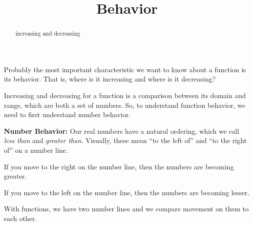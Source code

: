 \documentclass{ximera}
\title{Behavior}
\begin{document}
\begin{abstract}
increasing and decreasing
\end{abstract}
\maketitle



Probably the most important characteristic we want to know about a function is its behavior.  That is, where is it increasing and where is it decreasing? 




Increasing and decreasing for a function is a comparison between its domain and range, which are both a set of numbers.  So, to understand function behavior, we need to first understand number behavior.



\textbf{\textcolor{blue!55!black}{Number Behavior:}}  Our real numbers have a natural ordering, which we call \textit{less than} and \textit{greater than}.  Visually, these mean ``to the left of'' and ``to the right of'' on a number line. 

If you move to the right on the number line, then the numbers are becoming greater. 

If you move to the left on the number line, then the numbers are becoming lesser. 











With functions, we have two number lines and we compare movement on them to each other. 
\end{document}

